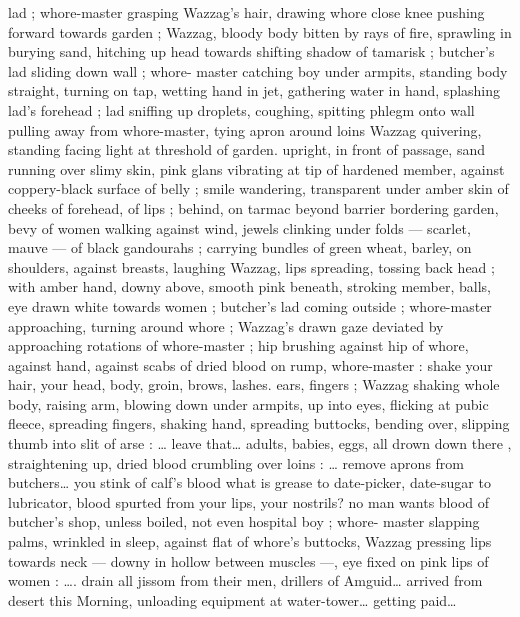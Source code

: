 lad ; whore-master grasping Wazzag's hair, drawing whore close 
knee pushing forward towards garden ; Wazzag, bloody body bitten 
by rays of fire, sprawling in burying sand, hitching up head towards 
shifting shadow of tamarisk ; butcher's lad sliding down wall ; whore- 
master catching boy under armpits, standing body straight, turning 
on tap, wetting hand in jet, gathering water in hand, splashing lad's 
forehead ; lad sniffing up droplets, coughing, spitting phlegm onto 
wall pulling away from whore-master, tying apron around loins 
Wazzag quivering, standing facing light at threshold of garden. 
upright, in front of passage, sand running over slimy skin, pink glans 
vibrating at tip of hardened member, against coppery-black surface 
of belly ; smile wandering, transparent under amber skin of cheeks 
of forehead, of lips ; behind, on tarmac beyond barrier bordering 
garden, bevy of women walking against wind, jewels clinking under 
folds --- scarlet, mauve --- of black gandourahs ; carrying bundles 
of green wheat, barley, on shoulders, against breasts, laughing 
Wazzag, lips spreading, tossing back head ; with amber hand, downy 
above, smooth pink beneath, stroking member, balls, eye drawn 
white towards women ; butcher's lad coming outside ; whore-master 
approaching, turning around whore ; Wazzag's drawn gaze deviated 
by approaching rotations of whore-master ; hip brushing against hip 
of whore, against hand, against scabs of dried blood on rump, 
whore-master :{\td} {\gl} {\td} shake your hair, your head, body, groin, brows, 
lashes. ears, fingers{\td} {\gr} ; Wazzag shaking whole body, raising arm, 
blowing down under armpits, up into eyes, flicking at pubic fleece, 
spreading fingers, shaking hand, spreading buttocks, bending over, 
slipping thumb into slit of arse : {\gl}{\ldots} leave that{\ldots} adults, babies, eggs, 
all drown down there{\td} {\gr}, straightening up, dried blood crumbling 
over loins : {\gl}{\ldots} remove aprons from butchers{\ldots} you stink of calf's 
blood{\td} what is grease to date-picker, date-sugar to lubricator, blood 
spurted from your lips, your nostrils?{\td} no man wants blood of 
butcher's shop, unless boiled,{\td} not even hospital boy {\gr} ; whore- 
master slapping palms, wrinkled in sleep, against flat of whore's 
buttocks, Wazzag pressing lips towards neck --- downy in hollow 
between muscles ---, eye fixed on pink lips of women : {\gl}{\ldots}. drain all 
jissom from their men, drillers of Amguid{\ldots} arrived from desert this 
Morning, unloading equipment at water-tower{\ldots} getting paid{\ldots} 
